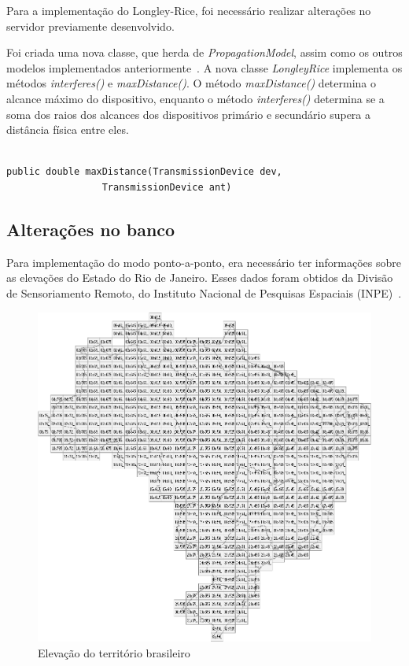 Para a implementação do Longley-Rice, foi necessário realizar alterações no servidor previamente desenvolvido. 

Foi criada uma nova classe, que herda de \textit{PropagationModel}, assim como os outros modelos implementados anteriormente~\cite{tccmarcelo}. A nova classe \textit{LongleyRice} implementa os métodos \textit{
interferes()} e \textit{maxDistance()}. O método \textit{maxDistance()} determina o alcance máximo do dispositivo, enquanto o método \textit{interferes()} determina se a soma dos raios dos alcances dos dispositivos primário e secundário supera a distância física entre eles.

\begin{lstlisting}

public double maxDistance(TransmissionDevice dev,
				 TransmissionDevice ant)

\end{lstlisting}

\subsection{Alterações no banco}

Para implementação do modo ponto-a-ponto, era necessário ter informações sobre as elevações do Estado do Rio de Janeiro. Esses dados foram obtidos da Divisão de Sensoriamento Remoto, do Instituto Nacional de Pesquisas Espaciais (INPE)~\cite{elevationdata}.

\begin{figure}[htb]
\centering
\includegraphics[width=1\textwidth]{figs/elevacaobrasil}
\caption[Elevação do território brasileiro.]
{Elevação do território brasileiro}
\label{fig:elevacaobrasil}
\end{figure}


